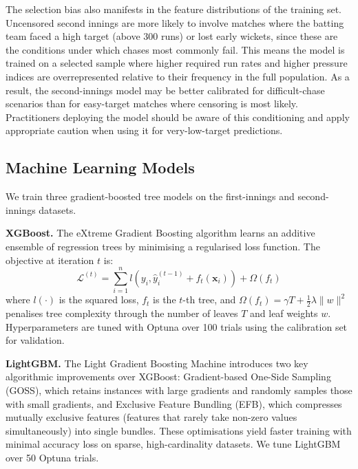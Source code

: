 \documentclass[10pt,a4paper,twocolumn]{article}
\begin{document}
The selection bias also manifests in the feature distributions of the training set. Uncensored second innings are more likely to involve matches where the batting team faced a high target (above 300 runs) or lost early wickets, since these are the conditions under which chases most commonly fail. This means the model is trained on a selected sample where higher required run rates and higher pressure indices are overrepresented relative to their frequency in the full population. As a result, the second-innings model may be better calibrated for difficult-chase scenarios than for easy-target matches where censoring is most likely. Practitioners deploying the model should be aware of this conditioning and apply appropriate caution when using it for very-low-target predictions.

\subsection{Machine Learning Models}

We train three gradient-boosted tree models on the first-innings and second-innings datasets.

\textbf{XGBoost.} The eXtreme Gradient Boosting algorithm \citep{Chen2016} learns an additive ensemble of regression trees by minimising a regularised loss function. The objective at iteration $t$ is:
\begin{equation}
\mathcal{L}^{(t)} = \sum_{i=1}^{n} l(y_i, \hat{y}_i^{(t-1)} + f_t(\mathbf{x}_i)) + \Omega(f_t)
\label{eq:xgb}
\end{equation}
where $l(\cdot)$ is the squared loss, $f_t$ is the $t$-th tree, and $\Omega(f_t) = \gamma T + \frac{1}{2}\lambda\|w\|^2$ penalises tree complexity through the number of leaves $T$ and leaf weights $w$. Hyperparameters are tuned with Optuna \citep{Akiba2019} over 100 trials using the calibration set for validation.

\textbf{LightGBM.} The Light Gradient Boosting Machine \citep{Ke2017} introduces two key algorithmic improvements over XGBoost: Gradient-based One-Side Sampling (GOSS), which retains instances with large gradients and randomly samples those with small gradients, and Exclusive Feature Bundling (EFB), which compresses mutually exclusive features (features that rarely take non-zero values simultaneously) into single bundles. These optimisations yield faster training with minimal accuracy loss on sparse, high-cardinality datasets. We tune LightGBM over 50 Optuna trials.
\end{document}
